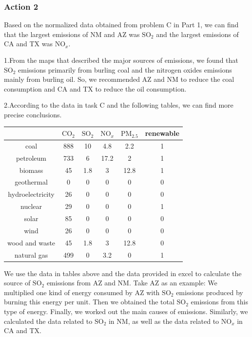 \documentclass[12pt]{article}
\begin{document}
\subsubsection{Action 2}

Based on the normalized data obtained from problem C in Part 1, we can find that the largest emissions of NM and AZ was $\mathrm{SO}_{2}$ and the largest emissions of CA and TX was $\mathrm{NO}_{x}$.

1.From the maps that described the major sources of emissions, we found that $\mathrm{SO}_{2}$ emissions primarily from burling coal and the nitrogen oxides emissions mainly from burling oil. So, we recommended AZ and NM to reduce the coal consumption and CA and TX to reduce the oil consumption.

2.According to the data in task C and the following tables, we can find more precise conclusions.

\begin{table}[h!]\centering\scriptsize
\begin{tabular}{|c|c|c|c|c|c| }
\hline
& $\mathrm{CO_{2}}$& $\mathrm{SO_{2}}$& $\mathrm{NO}_{x}$& $\mathrm{PM_{2.5}}$&renewable\\
\hline
coal	&888	&10	&4.8	&2.2	&1\\
\hline
petroleum	&733	&6	&17.2	&2	&1\\
\hline
biomass	&45&	1.8	&3	&12.8	&1\\
\hline
geothermal&	0	&0	&0	&0	&0\\
\hline
hydroelectricity&	26	&0	&0&0	&0\\
\hline
nuclear	&29&	0	&0	&0&	1\\
\hline
solar	&85&	0	&0	&0&0\\
\hline
wind	&26&	0	&0	&0	&0\\
\hline
wood and waste	&45	&1.8	&3	&12.8&	0\\
\hline
natural gas	&499	&0&	3.2&	0&	1\\

\hline
\end{tabular}
\end{table}

We use the data in tables above and the data provided in excel to calculate the source of $\mathrm{SO}_{2}$ emissions from AZ and NM. Take AZ as an example: We multiplied one kind of energy consumed by AZ with $\mathrm{SO}_{2}$ emissions produced by burning this energy per unit. Then we obtained the total $\mathrm{SO}_{2}$ emissions from this type of energy. Finally, we worked out the main causes of emissions. Similarly, we calculated the data related to $\mathrm{SO}_{2}$ in NM, as well as the data related to $\mathrm{NO}_{x}$ in CA and TX.
\end{document}

